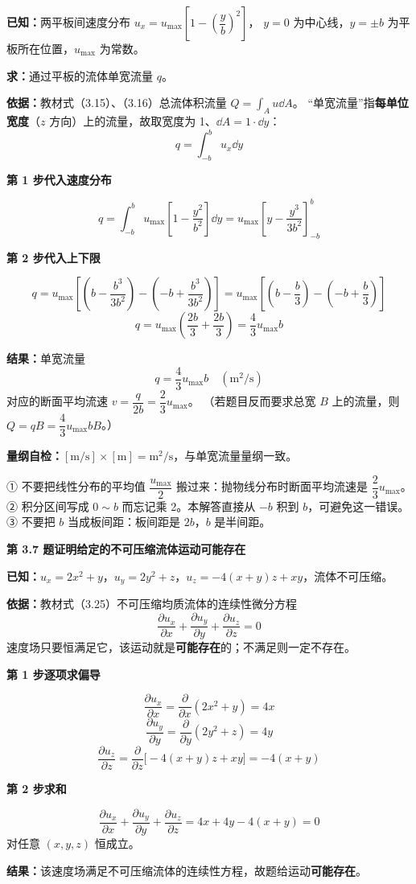 \begin{jie}
\textbf{已知：}两平板间速度分布 $u_x=u_{\max}\left[1-\left(\dfrac{y}{b}\right)^2\right]$，
$y=0$ 为中心线，$y=\pm b$ 为平板所在位置，$u_{\max}$ 为常数。

\textbf{求：}通过平板的流体单宽流量 $q$。

\textbf{依据：}教材式（3.15）、（3.16）总流体积流量 $Q=\displaystyle\int_A u\dd A$。
“单宽流量”指\textbf{每单位宽度}（$z$ 方向）上的流量，故取宽度为 1、$\dd A=1\cdot\dd y$：
\[ q=\int_{-b}^{b}u_x\dd y \]

\textbf{第 1 步\quad 代入速度分布}

\[ q=\int_{-b}^{b}u_{\max}\left[1-\frac{y^2}{b^2}\right]\dd y
   =u_{\max}\left[y-\frac{y^3}{3b^2}\right]_{-b}^{b} \]

\textbf{第 2 步\quad 代入上下限}

\[ q=u_{\max}\left[\left(b-\frac{b^3}{3b^2}\right)-\left(-b+\frac{b^3}{3b^2}\right)\right]
   =u_{\max}\left[\left(b-\frac{b}{3}\right)-\left(-b+\frac{b}{3}\right)\right] \]
\[ q=u_{\max}\left(\frac{2b}{3}+\frac{2b}{3}\right)=\frac{4}{3}u_{\max}b \]

\textbf{结果：}单宽流量
\[ q=\frac{4}{3}u_{\max}b\quad(\mathrm{m^2/s}) \]
对应的断面平均流速 $v=\dfrac{q}{2b}=\dfrac{2}{3}u_{\max}$。
（若题目反而要求总宽 $B$ 上的流量，则 $Q=qB=\dfrac{4}{3}u_{\max}bB$。）

\textbf{量纲自检：}$[\mathrm{m/s}]\times[\mathrm{m}]=\mathrm{m^2/s}$，与单宽流量量纲一致。
\end{jie}

\begin{yicuo}
① 不要把线性分布的平均值 $\dfrac{u_{\max}}{2}$ 搬过来：抛物线分布时断面平均流速是
$\dfrac{2}{3}u_{\max}$。
② 积分区间写成 $0\sim b$ 而忘记乘 2。本解答直接从 $-b$ 积到 $b$，可避免这一错误。
③ 不要把 $b$ 当成板间距：板间距是 $2b$，$b$ 是半间距。
\end{yicuo}

\noindent\textbf{第 3.7 题\quad 证明给定的不可压缩流体运动可能存在}

\begin{jie}
\textbf{已知：}$u_x=2x^2+y$，$u_y=2y^2+z$，$u_z=-4(x+y)z+xy$，流体不可压缩。

\textbf{依据：}教材式（3.25）不可压缩均质流体的连续性微分方程
\[ \frac{\partial u_x}{\partial x}+\frac{\partial u_y}{\partial y}+\frac{\partial u_z}{\partial z}=0 \]
速度场只要恒满足它，该运动就是\textbf{可能存在}的；不满足则一定不存在。

\textbf{第 1 步\quad 逐项求偏导}

\[ \frac{\partial u_x}{\partial x}=\frac{\partial}{\partial x}(2x^2+y)=4x \]
\[ \frac{\partial u_y}{\partial y}=\frac{\partial}{\partial y}(2y^2+z)=4y \]
\[ \frac{\partial u_z}{\partial z}=\frac{\partial}{\partial z}\bigl[-4(x+y)z+xy\bigr]=-4(x+y) \]

\textbf{第 2 步\quad 求和}

\[ \frac{\partial u_x}{\partial x}+\frac{\partial u_y}{\partial y}+\frac{\partial u_z}{\partial z}
   =4x+4y-4(x+y)=0 \]
对任意 $(x,y,z)$ 恒成立。

\textbf{结果：}该速度场满足不可压缩流体的连续性方程，故题给运动\textbf{可能存在}。
\end{jie}

